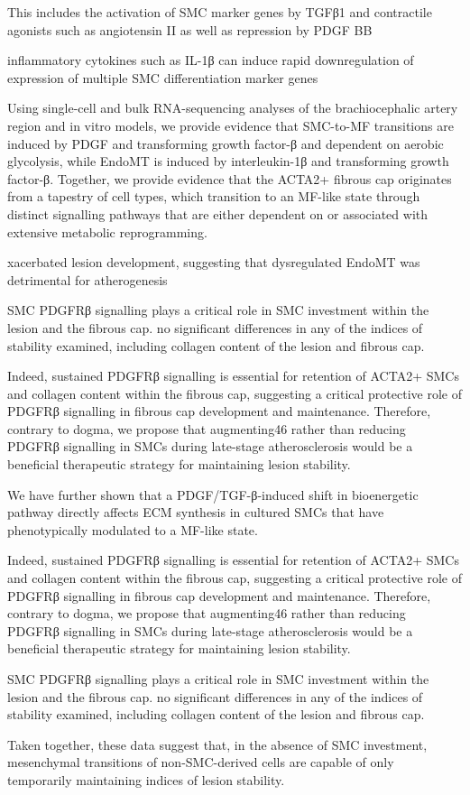 This includes the activation of SMC marker genes by TGFβ1 and contractile agonists such as angiotensin II as well as repression by PDGF BB

inflammatory cytokines such as IL-1β can induce rapid downregulation of expression of multiple SMC differentiation marker genes
\cite{alexanderEpigeneticControlSmooth2012a}

Using single-cell and bulk RNA-sequencing analyses of the brachiocephalic artery region and in vitro models, we provide evidence that SMC-to-MF transitions are induced by PDGF and transforming growth factor-β and dependent on aerobic glycolysis, while EndoMT is induced by interleukin-1β and transforming growth factor-β. Together, we provide evidence that the ACTA2+ fibrous cap originates from a tapestry of cell types, which transition to an MF-like state through distinct signalling pathways that are either dependent on or associated with extensive metabolic reprogramming.

xacerbated lesion development, suggesting that dysregulated EndoMT was detrimental for atherogenesis

SMC PDGFRβ signalling plays a critical role in SMC investment within the lesion and the fibrous cap. no significant differences in any of the indices of stability examined, including collagen content of the lesion and fibrous cap.

Indeed, sustained PDGFRβ signalling is essential for retention of ACTA2+ SMCs and collagen content within the fibrous cap, suggesting a critical protective role of PDGFRβ signalling in fibrous cap development and maintenance. Therefore, contrary to dogma, we propose that augmenting46 rather than reducing PDGFRβ signalling in SMCs during late-stage atherosclerosis would be a beneficial therapeutic strategy for maintaining lesion stability.

We have further shown that a PDGF/TGF-β-induced shift in bioenergetic pathway directly affects ECM synthesis in cultured SMCs that have phenotypically modulated to a MF-like state.



Indeed, sustained PDGFRβ signalling is essential for retention of ACTA2+ SMCs and collagen content within the fibrous cap, suggesting a critical protective role of PDGFRβ signalling in fibrous cap development and maintenance. Therefore, contrary to dogma, we propose that augmenting46 rather than reducing PDGFRβ signalling in SMCs during late-stage atherosclerosis would be a beneficial therapeutic strategy for maintaining lesion stability.

SMC PDGFRβ signalling plays a critical role in SMC investment within the lesion and the fibrous cap. no significant differences in any of the indices of stability examined, including collagen content of the lesion and fibrous cap.

Taken together, these data suggest that, in the absence of SMC investment, mesenchymal transitions of non-SMC-derived cells are capable of only temporarily maintaining indices of lesion stability.
\cite{newmanMultipleCellTypes2021}
